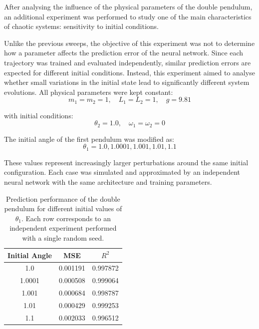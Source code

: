 After analysing the influence of the physical parameters of the double pendulum, an additional experiment was performed to study one of the main characteristics of chaotic systems: sensitivity to initial conditions.

Unlike the previous sweeps, the objective of this experiment was not to determine how a parameter affects the prediction error of the neural network. Since each trajectory was trained and evaluated independently, similar prediction errors are expected for different initial conditions. Instead, this experiment aimed to analyse whether small variations in the initial state lead to significantly different system evolutions.
All physical parameters were kept constant:
\begin{equation}
    m_1=m_2=1,\quad L_1=L_2=1,\quad g=9.81
\end{equation}

with initial conditions:
\begin{equation}
    \theta_2=1.0,\quad \omega_1=\omega_2=0
\end{equation}

The initial angle of the first pendulum was modified as:
\begin{equation}
    \theta_1={1.0,1.0001,1.001,1.01,1.1}
\end{equation}

These values represent increasingly larger perturbations around the same initial configuration. Each case was simulated and approximated by an independent neural network with the same architecture and training parameters.
\begin{table}[htbp]
\centering
\small
\begin{tabular}{ccc}
\toprule
Initial Angle & 
MSE & $R^2$ \\
\midrule
1.0 & 0.001191 & 0.997872 \\
1.0001 & 0.000508 & 0.999064 \\
1.001 & 0.000684 & 0.998787 \\
1.01 & 0.000429 & 0.999253 \\
1.1 & 0.002033 & 0.996512 \\

\bottomrule
\end{tabular}
\caption{Prediction performance of the double pendulum for different initial values of $\theta_1$. Each row corresponds to an independent experiment performed with a single random seed.}
\label{tab:double_pendulum_experiment}
\end{table}


